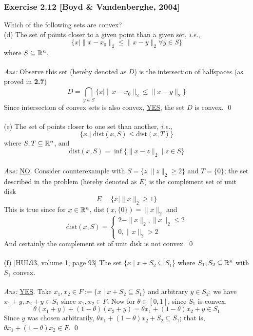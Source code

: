 \documentclass[12pt,a4paper]{article}
\newcommand{\casebrak}[2]{\left \{ \begin{array}{l} {#1}\\{#2} \end{array} \right.}
\newcommand{\CAP}[2]{\bigcap\limits_{#1}^{#2}}
\newcommand\ie{{\it i.e.}}
\def\R{\ifmmode\mathbb R\fi}
\begin{document}
\newpage\subsubsection*{Exercise 2.12 [Boyd \& Vandenberghe, 2004]}
\noindent Which of the following sets are convex? \\
(d) The set of points closer to a given point than a given set, \ie,
$$\{x \mid  \|x-x_0\|_2 \leq \|x-y\|_2 \forall y\in S\}$$
where $S\subseteq \R^n$. \\
\\
{\it Ans:} Observe this set (hereby denoted as $D$) is the intersection of halfspaces (as proved in {\bf 2.7})
$$D = \CAP{y\in S}{} \{x\mid  \|x-x_0\|_2 \leq \|x-y\|_2\}$$
Since intersection of convex sets is also convex, \underline{YES}, the set $D$ is convex. \qed \\
\\
(e) The set of points closer to one set than another, \ie, 
$$\{x \mid  \mbox{dist}(x, S) \leq \mbox{dist}(x, T)\}$$
where $S, T \subseteq \R^n$, and 
$$\mbox{dist}(x, S) = \inf\{\|x-z\|_2 \mid  z\in S\}$$
\\
{\it Ans:} \underline{NO}. Consider counterexample with $S = \{z \mid  \|z\|_2 \geq 2\}$ and $T = \{0\}$; the set described in the problem (hereby denoted as $E$) is the complement set of unit disk
$$E = \{x \mid  \|x\|_2 \geq 1\}$$
This is true since for $x\in\R^n$, $\mbox{dist}(x, \{0\}) = \|x\|_2$ and 
$$\mbox{dist}(x, S) = \casebrak{2-\|x\|_2,\|x\|_2 \leq 2}{0,\|x\|_2 > 2}$$
And certainly the complement set of unit disk is not convex. \qed \\
\\
(f) [HUL93, volume 1, page 93] The set $\{x \mid  x + S_2 \subseteq S_1\}$ where $S_1, S_2 \subseteq \R^n$ with $S_1$ convex. \\
\\
{\it Ans:} \underline{YES}. Take $x_1, x_2 \in F := \{x \mid x + S_2 \subseteq S_1\}$ and arbitrary $y\in S_2$; we have $x_1 + y, x_2 + y \in S_1$ since $x_1, x_2 \in F$. Now for $\theta \in [0, 1]$, since $S_1$ is convex, 
$$\theta(x_1+y) + (1-\theta)(x_2 + y)  = \theta x_1 + (1-\theta)x_2 + y\in S_1$$
Since $y$ was chosen arbitrarily, $\theta x_1 + (1-\theta)x_2 + S_2 \subseteq S_1$; that is, $\theta x_1 + (1-\theta)x_2 \in F$. \qed
\end{document}
